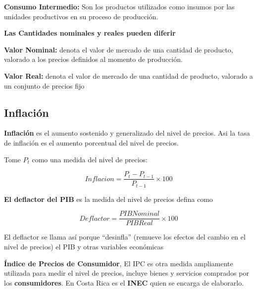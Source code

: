 \begin{definition}
\textbf{Consumo Intermedio:} Son los productos utilizados como insumos por las unidades productivos en su proceso de producción.
\end{definition}

\textbf{Las Cantidades nominales y reales pueden diferir}

\begin{definition}
\textbf{Valor Nominal: }denota el valor de mercado de una cantidad de producto, valorado a los precios definidos al momento de producción.
\end{definition}

\begin{definition}
\textbf{Valor Real: } denota el valor de mercado de una cantidad de producto, valorado a un conjunto de precios fijo
\end{definition}

\subsection{Inflación}

\begin{definition}
\textbf{Inflación} es el aumento sostenido y generalizado del nivel de precios.
Asi la tasa de inflación es el aumento porcentual del nivel de precios.
\end{definition}

Tome $P_{t}$ como una medida del nivel de precios:

\begin{equation}
   Inflacion = \frac{P_{t}-P_{t-1}}{P_{t-1}} \times 100
\end{equation}

\textbf{El deflactor del PIB} es la medida del nivel de precios defina como

\begin{equation}
    Deflactor = \frac{PIB Nominal}{PIB Real} \times 100
\end{equation}

El deflactor se llama así porque “desinfla” (remueve los efectos del cambio en el nivel de precios) el PIB y otras variables económicas

\textbf{Índice de Precios de Consumidor}, El IPC es otra medida ampliamente utilizada para medir el nivel de precios, incluye bienes y servicios comprados por los \textbf{consumidores}. En Costa Rica es el \textbf{INEC} quien se encarga de elaborarlo. 

